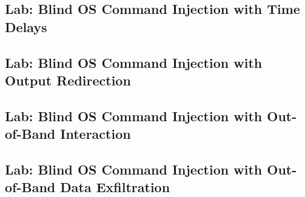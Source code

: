 \documentclass{article}
\begin{document}
\subsection*{Lab: Blind OS Command Injection with Time Delays}
\subsection*{Lab: Blind OS Command Injection with Output Redirection}
\subsection*{Lab: Blind OS Command Injection with Out-of-Band Interaction}
\subsection*{Lab: Blind OS Command Injection with Out-of-Band Data Exfiltration}
\end{document}
